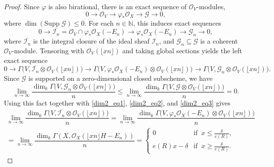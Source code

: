 \documentclass[12pt,a4paper]{amsart}
\theoremstyle{plain}
\theoremstyle{definition}
\numberwithin{equation}{theorem}
\begin{document}
\begin{proof}
Since $\varphi$ is also birational, there is an exact sequence of $\mathcal{O}_V$-modules, $$0 \to \mathcal{O}_V \to \varphi_*\mathcal{O}_X \to \mathcal{G}\to 0,$$ where $\dim \left(\mathrm{Supp}\;\mathcal{G}\right)\leq 0$. For each $n\in\mathbb{N}$, this induces exact sequences $$0 \to \overline{\mathcal{I}_n} = \mathcal{O}_{V} \cap \varphi_*\mathcal{O}_{X}(-E_n) \to \varphi_*\mathcal{O}_{X}(-E_n) \to \mathcal{G}_n \to 0,$$ where $\overline{\mathcal{I}_n}$ is the integral closure of the ideal sheaf $\mathcal{I}_n$, and $\mathcal{G}_n \subseteq \mathcal{G}$ is a coherent $\mathcal{O}_V$-module. Tensoring with $\mathcal{O}_V\left(\lfloor xn\rfloor\right)$ and taking global sections yields the left exact sequence
\begin{equation}\label{dim2_eq3}
 0 \to \Gamma\big(V,\overline{\mathcal{I}_n}\otimes\mathcal{O}_V\left(\lfloor xn\rfloor\right)\big) \to \Gamma\big(V,\varphi_*\mathcal{O}_X(-E_n) \otimes \mathcal{O}_V\left(\lfloor xn\rfloor\right)\big) \to \Gamma\big(V,\mathcal{G}_n\otimes \mathcal{O}_V\left(\lfloor xn\rfloor\right)\big).
\end{equation}
Since $\mathcal{G}$ is supported on a zero-dimensional closed subscheme, we have $$\lim_{n\to\infty}\dfrac{\dim_k \Gamma\big(V,\mathcal{G}_n\otimes \mathcal{O}_V\left(\lfloor xn\rfloor\right)\big)}{n} \leq \lim_{n\to\infty}\dfrac{\dim_k \Gamma\big(V,\mathcal{G}\otimes \mathcal{O}_V\left(\lfloor xn\rfloor\right)\big)}{n} = 0.$$ Using this fact together with \eqref{dim2_eq1}, \eqref{dim2_eq2}, and \eqref{dim2_eq3} gives
\begin{multline}\label{dim2_eq4}
 \lim_{n\to\infty}\dfrac{\dim_k \Gamma\big(V,\overline{\mathcal{I}_n}\otimes\mathcal{O}_V\left(\lfloor xn\rfloor\right)\big)}{n} = \lim_{n\to\infty}\dfrac{\dim_k \Gamma \big(V,\varphi_*\mathcal{O}_{X}(-E_n)\otimes\mathcal{O}_V\left(\lfloor xn\rfloor\right)\big)}{n}\\
 = \lim_{n\to\infty}\dfrac{\dim_k \Gamma \left(X,\mathcal{O}_X\left(\lfloor xn\rfloor H - E_n\right)\right)}{n}
 = \begin{cases}
    0 & \text{if}\;\;x\leq \frac{\delta}{e(R)},\\
    e(R)x-\delta & \text{if}\;\;x\geq \frac{\delta}{e(R)}.
   \end{cases}
\end{multline}


\end{proof}
\end{document}
